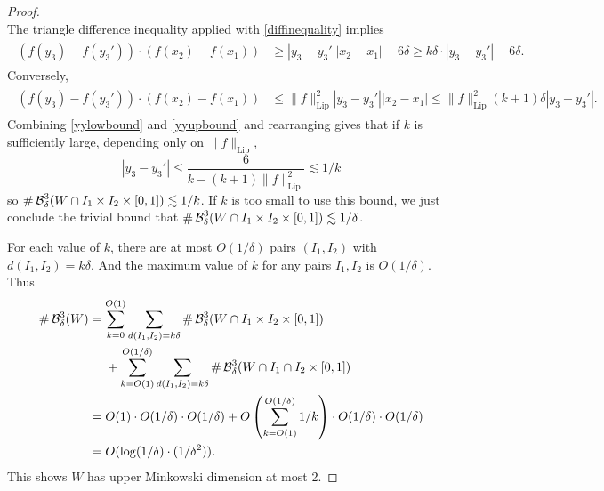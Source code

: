 \begin{proof}
\begin{equation}
	\end{equation}
	The triangle difference inequality applied with \eqref{diffinequality} implies
	\begin{align} \label{yylowbound}
	\begin{split}
		(f(y_3) - f(y_3')) \cdot (f(x_2) - f(x_1)) &\geq |y_3 - y_3'||x_2-x_1| - 6\delta \geq k\delta \cdot |y_3 - y_3'| - 6 \delta.
	\end{split}
	\end{align}
	Conversely,
	\begin{align} \label{yyupbound}
	\begin{split}
		(f(y_3) - f(y_3')) \cdot (f(x_2) - f(x_1)) &\leq \| f \|_{\text{Lip}}^2 |y_3 - y_3'| |x_2 - x_1| \leq \| f \|_{\text{Lip}}^2 (k+1) \delta |y_3 - y_3'|.
	\end{split}
	\end{align}
	Combining \eqref{yylowbound} and \eqref{yyupbound} and rearranging gives that if $k$ is sufficiently large, depending only on $\| f \|_{\text{Lip}}$, %
	\begin{equation} |y_3 - y_3'| \leq \frac{6}{k - (k+1) \| f \|_{\text{Lip}}^2} \lesssim 1/k \end{equation} %
	so $\# \operatorname{\mathcal{B}}^3_\delta(W \cap I_1 \times I_2 \times [0,1]) \lesssim 1/k$. If $k$ is too small to use this bound, we just conclude the trivial bound that $\# \operatorname{\mathcal{B}}^3_\delta(W \cap I_1 \times I_2 \times [0,1]) \lesssim 1/\delta$.

	For each value of $k$, there are at most $O(1/\delta)$ pairs $(I_1,I_2)$ with $d(I_1,I_2) = k \delta$. And the maximum value of $k$ for any pairs $I_1,I_2$ is $O(1/\delta)$. Thus
	\begin{align*}
		\# \operatorname{\mathcal{B}}^3_\delta(W) &= \sum_{k = 0}^{O(1)} \sum_{d(I_1,I_2) = k\delta} \# \operatorname{\mathcal{B}}^3_\delta(W \cap I_1 \times I_2 \times [0,1])\\
		&\ \ \ \  + \sum_{k = O(1)}^{O(1/\delta)} \sum_{d(I_1,I_2) = k\delta} \# \operatorname{\mathcal{B}}^3_\delta(W \cap I_1 \cap I_2 \times [0,1])\\
		&= O(1) \cdot O(1/\delta) \cdot O(1/\delta) + O \left( \sum_{k = O(1)}^{O(1/\delta)} 1/k \right) \cdot O(1/\delta) \cdot O(1/\delta)\\
		&= O(\log(1/\delta) \cdot (1/\delta^2)).
	\end{align*}
	This shows $W$ has upper Minkowski dimension at most 2.
\end{proof}

\endinput